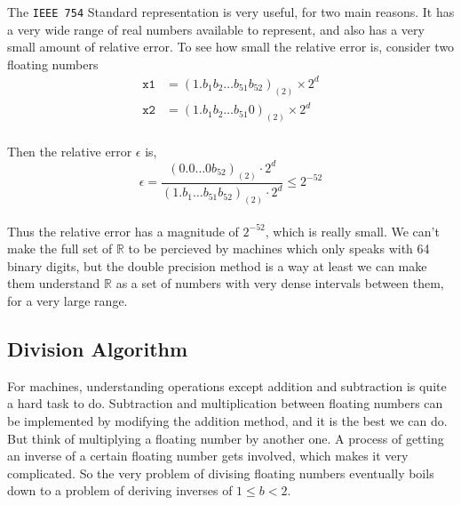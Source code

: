 \documentclass[paper=a4, fontsize=11pt]{scrartcl}
\begin{document}
The \texttt{IEEE 754} Standard representation is very useful, for two main reasons. It has a very wide range of real numbers available to represent, and also has a very small amount of relative error. To see how small the relative error is, consider two floating numbers\\

\begin{equation}\nonumber
\begin{split}
	\texttt{x1} &= (1.b_1b_2\dots b_{51} b_{52})_{(2)} \times 2^d  \\
	\texttt{x2} &= (1.b_1b_2\dots b_{51} 0)_{(2)} \times 2^d
\end{split}
\end{equation}\\

Then the relative error $\epsilon$ is, \\

\begin{equation}\nonumber
	\epsilon = \frac{(0.0\dots0b_{52})_{(2)} \cdot 2^d}{(1.b_1\dots b_{51}b_{52})_{(2)} \cdot 2^d} \leq 2^{-52}
\end{equation}\\

Thus the relative error has a magnitude of $2^{-52}$, which is really small. We can't make the full set of $\mathbb{R}$ to be percieved by machines which only speaks with 64 binary digits, but the double precision method is a way at least we can make them understand $\mathbb{R}$ as a set of numbers with very dense intervals between them, for a very large range.

\vspace{0.15in}

\subsection{Division Algorithm}
\vspace{0.15in}

For machines, understanding operations except addition and subtraction is quite a hard task to do. Subtraction and multiplication  between floating numbers can be implemented by modifying the addition method, and it is the best we can do. But think of multiplying a floating number by another one.  A process of getting an inverse of a certain floating number gets involved, which makes it very complicated. So the very problem of divising floating numbers eventually boils down to a problem of deriving inverses of $1\leq b <2$. \\
\end{document}
